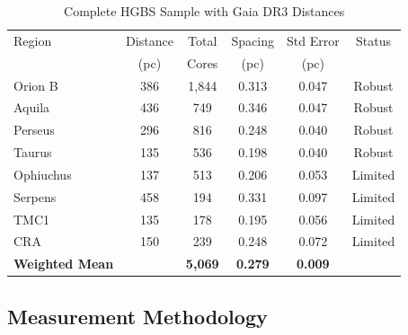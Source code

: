 \documentclass[twoside,twocolumn]{mnras}
\begin{document}
\begin{table}
\caption{Complete HGBS Sample with Gaia DR3 Distances}
\label{tab:sample}
\begin{tabular}{lccccc}
\toprule
Region & Distance & Total & Spacing & Std Error & Status \\
       & (pc)   & Cores & (pc)   & (pc)      &  \\
\midrule
Orion B  & 386 & 1,844 & 0.313 & 0.047 & Robust \\
Aquila   & 436 & 749   & 0.346 & 0.047 & Robust \\
Perseus  & 296 & 816   & 0.248 & 0.040 & Robust \\
Taurus   & 135 & 536   & 0.198 & 0.040 & Robust \\
Ophiuchus& 137 & 513   & 0.206 & 0.053 & Limited \\
Serpens  & 458 & 194   & 0.331 & 0.097 & Limited \\
TMC1     & 135 & 178   & 0.195 & 0.056 & Limited \\
CRA      & 150 & 239   & 0.248 & 0.072 & Limited \\
\midrule
\textbf{Weighted Mean} &  & \textbf{5,069} & \textbf{0.279} & \textbf{0.009} &  \\
\bottomrule
\end{tabular}
\end{table}

\subsection{Measurement Methodology}
\end{document}
